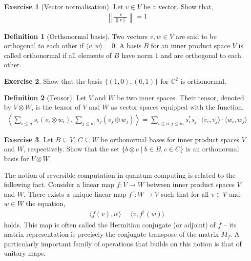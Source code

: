 \documentclass[a4paper, 11pt]{article}
\newcommand{\complex}{\mathbb{C}}
\theoremstyle{definition}
\newtheorem{definition}{Definition}
\newtheorem{exercise}{Exercise}
\begin{document}
\begin{exercise}[Vector normalisation]
  Let $v \in V$ be a vector. Show that,
  \begin{align*}
   \left \| \frac{v}{\| v \|} \right \| = 1 
  \end{align*}

\end{exercise}

\begin{definition}[Orthonormal basis]
  Two vectors $v,w \in V$ are said to be orthogonal to each other if
  $ \langle v,w \rangle = 0$.  A basis $B$ for an inner product space
  $V$ is called orthonormal if all elements of $B$ have norm $1$ and
  are orthogonal to each other.
\end{definition}

\begin{exercise}
  Show that the basis $\{ (1,0), (0,1) \}$ for $\complex^2$ is
  orthonormal.
\end{exercise}

\begin{definition}[Tensor]
  Let $V$ and $W$ be two inner spaces. Their tensor, denoted by
  $V \otimes W$, is the tensor of $V$ and $W$ as vector spaces
  equipped with the function,
  \begin{align*}
    \left \langle  \sum_{i \leq n} s_i (v_i \otimes w_i), \sum_{j \leq m} s_j (v_j \otimes w_j)
    \right \rangle = \sum_{i \leq n, j \leq m} s_i^\ast s_j \cdot \langle v_i,v_j \rangle
    \cdot \langle w_i,w_j \rangle
  \end{align*}
\end{definition}

\begin{exercise}
  Let $B \subseteq V$, $C \subseteq W$ be orthonormal bases for inner
  product spaces $V$ and $W$, respectively.  Show that the set
  $\{ b \otimes c \mid b \in B, c \in C \}$ is an orthonormal basis
  for $V \otimes W$.
\end{exercise}

The notion of reversible computation in quantum computing is related
to the following fact.  Consider a linear map $f : V \to W$ between
inner product spaces $V$ and $W$. There exists a unique linear map
$f^\dagger : W \to V$ such that for all $v \in V$ and $w \in W$ the
equation,
\begin{align*}
  \langle f (v), w \rangle = \langle v, f^\dagger (w) \rangle
\end{align*}
holds. This map is often called the Hermitian conjugate (or adjoint)
of $f$ -- its matrix representation is precisely the conjugate
transpose of the matrix $M_f$. A particularly important family of
operations that builds on this notion is that of unitary maps.
\end{document}
